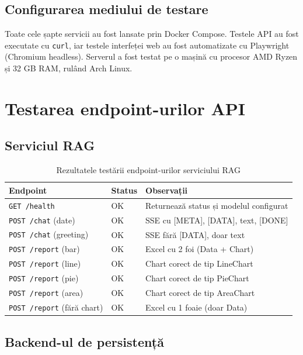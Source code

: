 \documentclass[12pt, a4paper]{report}
\newcommand{\code}[1]{\texttt{#1}}
\begin{document}
\subsection{Configurarea mediului de testare}

Toate cele șapte servicii au fost lansate prin Docker Compose. Testele API au fost executate cu \code{curl}, iar testele interfeței web au fost automatizate cu Playwright (Chromium headless). Serverul a fost testat pe o mașină cu procesor AMD Ryzen și 32 GB RAM, rulând Arch Linux.

\section{Testarea endpoint-urilor API}

\subsection{Serviciul RAG}

\begin{table}[H]
\centering
\caption{Rezultatele testării endpoint-urilor serviciului RAG}
\label{tab:test_rag}
\begin{tabularx}{\textwidth}{l l X}
\toprule
\textbf{Endpoint} & \textbf{Status} & \textbf{Observații} \\
\midrule
\code{GET /health} & OK & Returnează status și modelul configurat \\
\code{POST /chat} (date) & OK & SSE cu [META], [DATA], text, [DONE] \\
\code{POST /chat} (greeting) & OK & SSE fără [DATA], doar text \\
\code{POST /report} (bar) & OK & Excel cu 2 foi (Data + Chart) \\
\code{POST /report} (line) & OK & Chart corect de tip LineChart \\
\code{POST /report} (pie) & OK & Chart corect de tip PieChart \\
\code{POST /report} (area) & OK & Chart corect de tip AreaChart \\
\code{POST /report} (fără chart) & OK & Excel cu 1 foaie (doar Data) \\
\bottomrule
\end{tabularx}
\end{table}

\subsection{Backend-ul de persistență}
\end{document}
